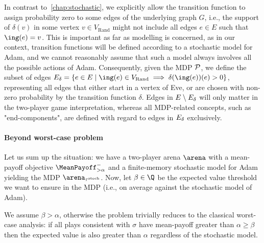 In contrast to~\cref{chap:stochastic}, we explicitly allow the transition function to assign probability zero to some edges of the underlying graph $G$, i.e., the support of $\delta(v)$ in some vertex $v \in V_{\text{Rand}}$ might not include all edges $e \in E$ such that $\ing(e) = v$.
This is important as far as modelling is concerned, as in our context, transition functions will be defined according to a stochastic model for Adam, and we cannot reasonably assume that such a model always involves all the possible actions of Adam. Consequently, given the MDP ${\mathcal{P}}$, we define the subset of edges $\edgesNonZero = \{ e \in E \mid \ing(e) \in V_{\text{Rand}} \implies \delta(\ing(e))(e) > 0\}$, representing all edges that either start in a vertex of Eve, or are chosen with non-zero probability by the transition function $\delta$. Edges in $E\setminus E_{\delta}$ will only matter in the two-player game interpretation, whereas all MDP-related concepts, such as "end-components", are defined with regard to edges in $E_{\delta}$ exclusively.

\paragraph{Beyond worst-case problem} Let us sum up the situation: we have a two-player arena $\arena$ with a mean-payoff objective $\MeanPayoff^{-}_{> \alpha}$ and a finite-memory stochastic model for Adam yielding the MDP $\arena_{\tau^\text{stoch}}$. Now, let $\beta \in \Q$ be the expected value threshold we want to ensure in the MDP (i.e., on average against the stochastic model of Adam).



We assume $\beta > \alpha$, otherwise the problem trivially reduces to the classical worst-case analysis: if all plays consistent with $\sigma$ have mean-payoff greater than $\alpha \geq \beta$ then the expected value is also greater than $\alpha$ regardless of the stochastic model.


